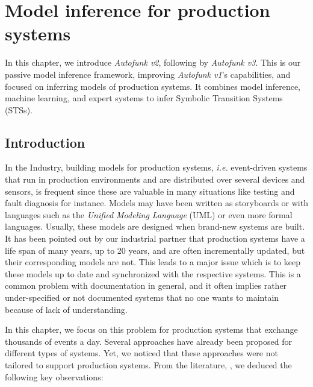 \chapter{Model inference for production systems}
\label{sec:modelinf:prodsystems}

In this chapter, we introduce \emph{Autofunk v2}, following by
\emph{Autofunk v3}. This is our passive model inference
framework, improving \emph{Autofunk v1}'s capabilities, and
focused on inferring models of production systems. It combines
model inference, machine learning, and expert systems to infer
Symbolic Transition Systems (STSs).
\\

\minitoc

\pagebreak

\section{Introduction}

In the Industry, building models for production systems,
\emph{i.e.} event-driven systems that run in production
environments and are distributed over several devices and
sensors, is frequent since these are valuable in many situations
like testing and fault diagnosis for instance. Models may have
been written as storyboards or with languages such as the \emph{Unified
Modeling Language} (UML) or even more formal languages. Usually,
these models are designed when brand-new systems are built. It
has been pointed out by our industrial partner that production
systems have a life span of many years, up to 20 years, and are
often incrementally updated, but their corresponding models are
not.  This leads to a major issue which is to keep these models
up to date and synchronized with the respective systems. This is
a common problem with documentation in general, and it often
implies rather under-specified or not documented systems that no
one wants to maintain because of lack of understanding.

In this chapter, we focus on this problem for production systems
that exchange thousands of events a day. Several approaches have
already been proposed for different types of systems.  Yet, we
noticed that these approaches were not tailored to support
production systems. From the literature,
, we deduced the
following key observations:

